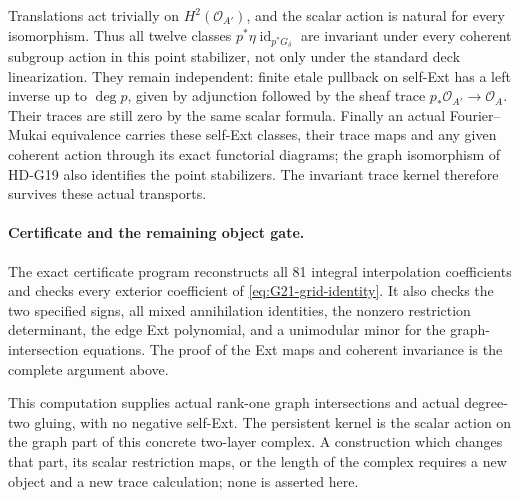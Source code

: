 Translations act trivially on \(H^2(\mathcal O_{A'})\), and the
scalar action is natural for every isomorphism. Thus all twelve
classes
\(p^*\eta\operatorname{id}_{p^*G_\delta}\) are invariant under
every coherent subgroup action in this point stabilizer, not only
under the standard deck linearization. They remain independent:
finite etale pullback on self-Ext has a left inverse up to \(\deg p\),
given by adjunction followed by the sheaf trace
\(p_*\mathcal O_{A'}\to\mathcal O_A\).
Their traces are still zero by the same scalar formula. Finally an
actual Fourier--Mukai equivalence carries these self-Ext classes,
their trace maps and any given coherent action through its exact
functorial diagrams; the graph isomorphism of HD-G19 also identifies
the point stabilizers. The invariant trace kernel therefore survives
these actual transports.

\paragraph{Certificate and the remaining object gate.}
The exact certificate program
 reconstructs
all 81 integral interpolation coefficients and checks every exterior
coefficient of \eqref{eq:G21-grid-identity}. It also checks the two
specified signs, all mixed annihilation identities, the nonzero
restriction determinant, the edge Ext polynomial, and a unimodular
minor for the graph-intersection equations. The proof of the Ext maps
and coherent invariance is the complete argument above.

This computation supplies actual rank-one graph intersections and
actual degree-two gluing, with no negative self-Ext. The persistent
kernel is the scalar action on the graph part of this concrete
two-layer complex. A construction which changes that part, its scalar
restriction maps, or the length of the complex requires a new object
and a new trace calculation; none is asserted here.
